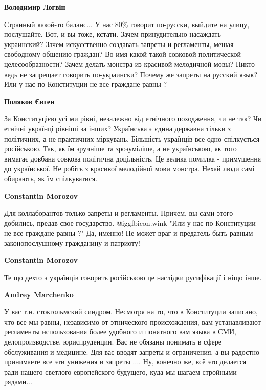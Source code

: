 \begin{itemize}
\begin{itemize}

\textbf{Володимир Логвін} 

Странный какой-то баланс... У нас 80\% говорит по-русски, выйдите на улицу,
послушайте. Вот, и вы тоже, кстати. Зачем принудительно насаждать украинский?
Зачем искусственно создавать запреты и регламенты, мешая свободному общению
граждан? Во имя какой такой совковой политической целесообразности? Зачем
делать монстра из красивой мелодичной мовы? Никто ведь не запрещает говорить
по-украински? Почему же запреты на русский язык? Или у нас по Конституции не
все граждане равны ?


\textbf{Поляков Євген} 

За Конституцією усі ми рівні, незалежно від етнічного походження, чи не так? Чи
етнічні українці рівніші за інших? Українська є єдина державна тільки з
політичних, а не практичних міркувань. Більшість українців все одно спілкується
російською. Так, як їм зручніше та зрозуміліше, а не українською, як того
вимагає довбана совкова політична доцільність. Це велика помилка - примушення
до української. Не робіть з красивої мелодійної мови монстра. Нехай люди самі
обирають, як їм спілкуватися.

\textbf{Constantin Morozov} 

Для коллаборантов только запреты и регламенты. Причем, вы сами этого добились,
предав свое государство.  @igg{fbicon.wink}  "Или у нас по Конституции не все граждане равны ?"
Да, именно! Не может враг и предатель быть равным законопослушному гражданину и
патриоту!


\textbf{Constantin Morozov} 

Те що дехто з українців говорить російською це наслідки русифікації і ніщо інше.


\textbf{Andrey Marchenko} 

У вас т.н. стокгольмский синдром. Несмотря на то, что в Конституции записано,
что все мы равны, независимо от этнического происхождения, вам устанавливают
регламенты использования более удобного и понятного вам языка в СМИ,
делопроизводстве, юриспруденции. Вас не обязаны понимать в сфере обслуживания и
медицине. Для вас вводят запреты и ограничения, а вы радостно принимаете все
эти унижения и запреты .... Ну, конечно же, всё это делается ради нашего
светлого европейского будущего, куда мы шагаем стройными рядами...


\end{itemize}
\end{itemize}
